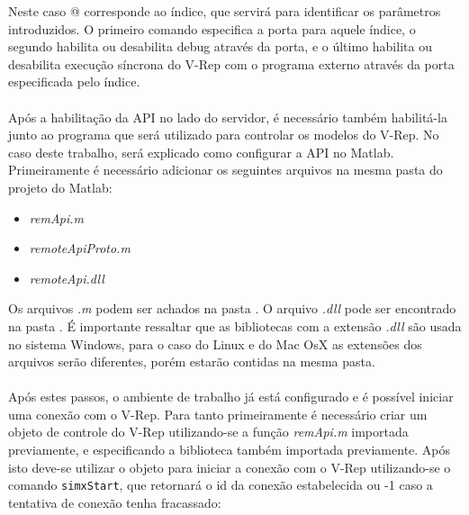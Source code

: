 Neste caso @ corresponde ao índice, que servirá para identificar os parâmetros introduzidos. O primeiro comando especifica a porta para aquele índice, o segundo habilita ou desabilita debug através da porta, e o último habilita ou desabilita execução síncrona do V-Rep com o programa externo através da porta especificada pelo índice.

\paragraph{}
Após a habilitação da API no lado do servidor, é necessário também habilitá-la junto ao programa que será utilizado para controlar os modelos do V-Rep. No caso deste trabalho, será explicado como configurar a API no Matlab. Primeiramente é necessário adicionar os seguintes arquivos na mesma pasta do projeto do Matlab:

\begin{itemize}
	\item \emph{remApi.m}
	\item \emph{remoteApiProto.m}
	\item \emph{remoteApi.dll}
\end{itemize}

Os arquivos \emph{.m} podem ser achados na pasta . O arquivo \emph{.dll} pode ser encontrado na pasta . É importante ressaltar que as bibliotecas com a extensão \emph{.dll} são usada no sistema Windows, para o caso do Linux e do Mac OsX as extensões dos arquivos serão diferentes, porém estarão contidas na mesma pasta.

\paragraph{}
Após estes passos, o ambiente de trabalho já está configurado e é possível iniciar uma conexão com o V-Rep. Para tanto primeiramente é necessário criar um objeto de controle do V-Rep utilizando-se a função \emph{remApi.m} importada previamente, e especificando a biblioteca também importada previamente. Após isto deve-se utilizar o objeto para iniciar a conexão com o V-Rep utilizando-se o comando \texttt{simxStart}, que retornará o id da conexão estabelecida ou -1 caso a tentativa de conexão tenha fracassado:


